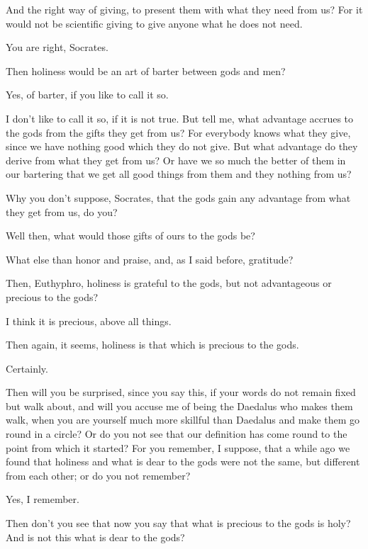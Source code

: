 \documentclass[letterpaper,12pt]{article}
\newcommand{\stephpag}[1]{\marginnote{\small\itshape\fontfamily{ppl}\selectfont #1}}
\begin{document}
\begin{drama}
\socratesspeaks
And the right way of giving, to present them with \stephpag{e} what they need from us? For it would not be scientific giving to give anyone what he does not need.

\euthyphrospeaks
You are right, Socrates.

\socratesspeaks
Then holiness would be an art of barter between gods and men?

\euthyphrospeaks
Yes, of barter, if you like to call it so.

\socratesspeaks
I don't like to call it so, if it is not true. But tell me, what advantage accrues to the gods from the gifts they get from us? For everybody knows what they give, \stephpag{15 a} since we have nothing good which they do not give. But what advantage do they derive from what they get from us? Or have we so much the better of them in our bartering that we get all good things from them and they nothing from us?

\euthyphrospeaks
Why you don't suppose, Socrates, that the gods gain any advantage from what they get from us, do you?

\socratesspeaks
Well then, what would those gifts of ours to the gods be?

\euthyphrospeaks
What else than honor and praise, and, as I said before, gratitude? \stephpag{b}

\socratesspeaks
Then, Euthyphro, holiness is grateful to the gods, but not advantageous or precious to the gods?

\euthyphrospeaks
I think it is precious, above all things.

\socratesspeaks
Then again, it seems, holiness is that which is precious to the gods.

\euthyphrospeaks
Certainly.

\socratesspeaks
Then will you be surprised, since you say this, if your words do not remain fixed but walk about, and will you accuse me of being the Daedalus who makes them walk, when you are yourself much more skillful than Daedalus and make them go round in a circle? Or do you not see \stephpag{c} that our definition has come round to the point from which it started? For you remember, I suppose, that a while ago we found that holiness and what is dear to the gods were not the same, but different from each other; or do you not remember?

\euthyphrospeaks
Yes, I remember.

\socratesspeaks
Then don't you see that now you say that what is precious to the gods is holy? And is not this what is dear to the gods?


\end{drama}
\end{document}
